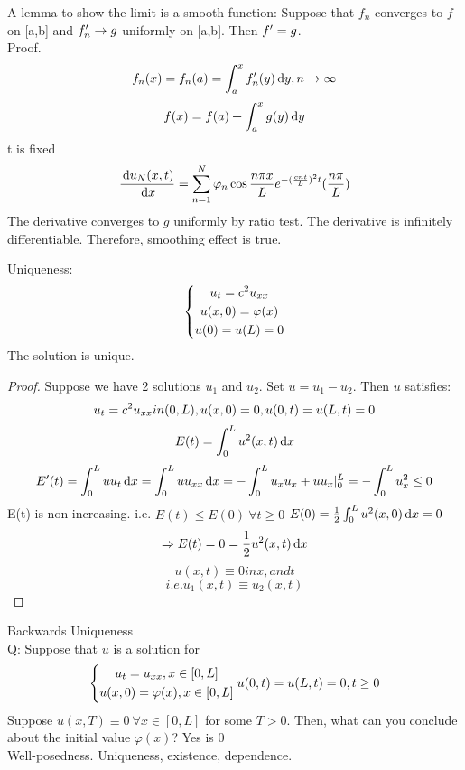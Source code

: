 A lemma to show the limit is a smooth function:
Suppose that $f_n$ converges to $f$ on [a,b] and $f^{\prime}_n\rightarrow g$ uniformly on [a,b]. Then $f^{\prime}=g$.\\
Proof. 
\[f_n(x)=f_n(a)=\int_a^x f^{\prime}_n(y)\,\mathrm{d} y, n\rightarrow\infty
\]
\[f(x)=f(a)+\int_a^xg(y)\,\mathrm{d} y
\]
t is fixed
\[\frac{\,\mathrm{d} u_N(x,t)}{\,\mathrm{d} x}=\sum_{n=1}^N\varphi_n\cos\frac{n\pi x}{L}e^{-(\frac{cnt}{L})^2t}(\frac{n\pi}{L})
\]
The derivative converges to $g$ uniformly by ratio test. The derivative is infinitely differentiable. Therefore, smoothing effect is true.
\begin{theorem}
Uniqueness:
\[\left\{\begin{gathered}u_{t}=c^2u_{xx}\\u(x,0)=\varphi(x)\\u(0)=u(L)=0 \end{gathered}\right.
\]
The solution is unique.
\end{theorem}
\begin{proof}
Suppose we have 2 solutions $u_1$ and $u_2$. Set $u=u_1-u_2$. Then $u$ satisfies:
\[u_{t}=c^2u_{xx} in (0,L), u(x,0)=0, u(0,t)=u(L,t)=0
\]
\[E(t)=\int_0^Lu^2(x,t)\,\mathrm{d} x
\]
\[E^{\prime}(t)=\int_0^Luu_{t}\,\mathrm{d} x=\int_0^Luu_{xx}\,\mathrm{d} x=-\int_0^Lu_xu_x+uu_x|_0^L=-\int_0^Lu_x^2\leq0
\]
E(t) is non-increasing.
i.e. $E(t)\leq E(0)~\forall t\geq 0$
$E(0)=\frac{1}{2}\int_0^Lu^2(x,0)\,\mathrm{d} x=0$
\[\Rightarrow  E(t)=0=\frac{1}{2}u^2(x,t)\,\mathrm{d} x
\]
\[u(x,t)\equiv0 in x, and t
\]
\[i.e. u_1(x,t)\equiv u_2(x,t)
\]
\end{proof}

Backwards Uniqueness\\
Q: Suppose that $u$ is a solution for
\[\left\{\begin{gathered}u_{t}=u_{xx}, x\in[0,L]\\u(x,0)=\varphi(x), x\in[0,L]\end{gathered}\right.{u(0,t)=u(L,t)=0, t\geq 0}
\]
Suppose $u(x,T)\equiv0~\forall x\in[0,L]$ for some $T>0$. Then, what can you conclude about the initial value $\varphi(x)$? Yes is 0\\
Well-posedness. Uniqueness, existence, dependence.






